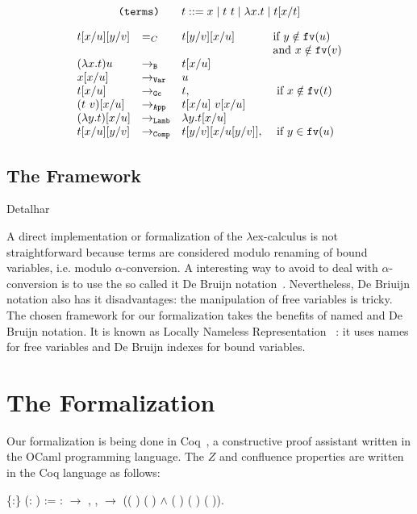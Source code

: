 \documentclass{llncs}
\newcommand{\fv}[1]{{\tt fv}(#1)}
\newcommand{\flavio}[1]{{\color{red} #1}}
\begin{document}
$$\mbox{\tt (terms)}\;\;\;\;\;\;\; t ::= x \mid t\ t \mid \lambda x.t \mid t[x/t]$$

$$\begin{array}{llll}
    t[x/u][y/v] & =_C & t[y/v][x/u] & \mbox{if } y\notin \fv{u} \\
                &&& \mbox{and } x\notin \fv{v} \\
    (\lambda x.t) u & \to_{\tt B} & t[x/u] & \\
    x[x/u] & \to_{\tt Var} & u & \\      
    t[x/u] & \to_{\tt Gc} & t, & \mbox{ if } x \notin\fv{t} \\      
    (t\ v)[x/u] & \to_{\tt App} & t[x/u]\ v[x/u] & \\
    (\lambda y. t)[x/u] & \to_{\tt Lamb} & \lambda y.t[x/u] & \\
    t[x/u][y/v] & \to_{\tt Comp} & t[y/v][x/u[y/v]], & \mbox{ if } y \in\fv{u}            
  \end{array}$$
  
  \subsection{The Framework}

  \flavio{Detalhar}

  A direct implementation or formalization of the $\lambda$ex-calculus
  is not straightforward because terms are considered modulo renaming
  of bound variables, i.e. modulo $\alpha$-conversion. A interesting
  way to avoid to deal with $\alpha$-conversion is to use the so
  called {it De Bruijn}
  notation~\cite{bruijn72:_lambd_churc_rosser}. Nevertheless, De
  Briuijn notation also has it disadvantages: the manipulation of free
  variables is tricky. The chosen framework for our formalization
  takes the benefits of named and De Bruijn notation. It is known as
  Locally Nameless Representation ~\cite{Ch11}: it uses names for free
  variables and De Bruijn indexes for bound variables.

\section{The Formalization}
  
Our formalization is being done in Coq~\cite{CoqTeam}, a constructive
proof assistant written in the OCaml programming language. The
$Z$ and confluence properties are written in the Coq language as follows:

\begin{coqdoccode}
  \coqdocnoindent {}
   \{:\}
  (:  ) :=
  \coqdoctac{\ensuremath{\exists}} :
  \ensuremath{\rightarrow} ,
  \coqdockw{\ensuremath{\forall}}  ,
     \ensuremath{\rightarrow}
  (( ) 
  ( ) \ensuremath{\land}
  ( ) (
  ) ( )).\coqdoceol
\end{coqdoccode}
\end{document}
